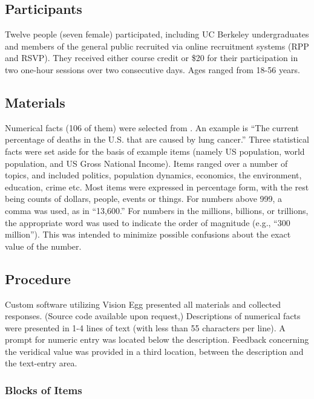 \subsection{Participants}

Twelve people (seven female) participated, including UC Berkeley undergraduates
and members of the general public recruited via online recruitment systems (RPP
and RSVP). They received either course credit or \$20 for their participation in
two one-hour sessions over two consecutive days. Ages ranged from 18-56 years. 

\subsection{Materials}

Numerical facts (106 of them) were selected from \citeauthor{ranney_designing_2008}
. An example is ``The current percentage of deaths in the U.S. that are
caused by lung cancer.'' Three statistical facts were set aside for the basis of
example items (namely US population, world population, and US Gross National
Income). Items ranged over a number of topics, and included politics, population
dynamics, economics, the environment, education, crime etc. Most items were
expressed in percentage form, with the rest being counts of dollars, people,
events or things. For numbers above 999, a comma was used, as in ``13,600.''  For
numbers in the millions, billions, or trillions, the appropriate word was used
to indicate the order of magnitude (e.g., ``300 million'').  This was intended to
minimize possible confusions about the exact value of the number.

\subsection{Procedure}

Custom software utilizing Vision Egg \cite{straw_vision_2008} presented all materials and
collected responses. (Source code available upon request,)  Descriptions of
numerical facts were presented in 1-4 lines of text (with less than 55
characters per line). A prompt for numeric entry was located below the
description. Feedback concerning the veridical value was provided in a third
location, between the description and the text-entry area.

\subsubsection{Blocks of Items}

